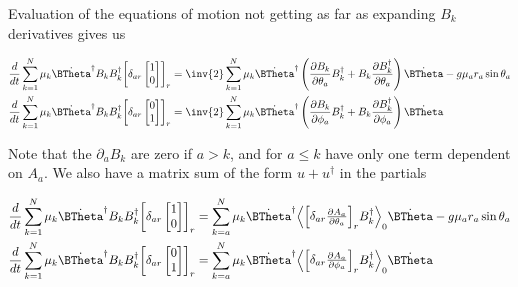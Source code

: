 Evaluation of the equations of motion not getting as far as expanding $B_k$ derivatives gives us

\begin{align}\label{eqn:multiPendulumSpherical2:boo6}
\frac{d}{dt}
\sum_{k=1}^N \mu_k
\dot{\BTheta}^\dagger
B_k B_k^\dagger
{\begin{bmatrix}
\delta_{ar}
\begin{bmatrix}
1 \\
0
\end{bmatrix}
\end{bmatrix}}_r
&=
\inv{2} \sum_{k=1}^N \mu_k
\dot{\BTheta}^\dagger
\left(
\PD{\theta_a}{B_k} B_k^\dagger + B_k \PD{\theta_a}{B_k^\dagger } \right)
\dot{\BTheta}
-g \mu_a r_a \sin\theta_a \\
\frac{d}{dt}
\sum_{k=1}^N \mu_k
\dot{\BTheta}^\dagger
B_k B_k^\dagger
{\begin{bmatrix}
\delta_{ar}
\begin{bmatrix}
0 \\
1
\end{bmatrix}
\end{bmatrix}}_r
&=
\inv{2} \sum_{k=1}^N \mu_k
\dot{\BTheta}^\dagger
\left(
\PD{\phi_a}{B_k} B_k^\dagger + B_k \PD{\phi_a}{B_k^\dagger } \right)
\dot{\BTheta}
\end{align}

Note that the $\partial_a B_k$ are zero if $a > k$, and for $a \le k$ have only one term dependent on $A_a$.  We also have a matrix sum of the form $u + u^\dagger$ in the partials

\begin{align}\label{eqn:multiPendulumSpherical2:boo7}
\frac{d}{dt}
\sum_{k=1}^N \mu_k
\dot{\BTheta}^\dagger
B_k B_k^\dagger
{\begin{bmatrix}
\delta_{ar}
\begin{bmatrix}
1 \\
0
\end{bmatrix}
\end{bmatrix}}_r
&=
\sum_{k=a}^N \mu_k
\dot{\BTheta}^\dagger
\gpgradezero{
{\begin{bmatrix}
\delta_{ar}
\PD{\theta_a}{A_a} \\
\end{bmatrix}}_r
B_k^\dagger }
\dot{\BTheta}
-g \mu_a r_a \sin\theta_a \\
\frac{d}{dt}
\sum_{k=1}^N \mu_k
\dot{\BTheta}^\dagger
B_k B_k^\dagger
{\begin{bmatrix}
\delta_{ar}
\begin{bmatrix}
0 \\
1
\end{bmatrix}
\end{bmatrix}}_r
&=
\sum_{k=a}^N \mu_k
\dot{\BTheta}^\dagger
\gpgradezero{
{\begin{bmatrix}
\delta_{ar}
\PD{\phi_a}{A_a} \\
\end{bmatrix}}_r
B_k^\dagger }
\dot{\BTheta}
\end{align}

